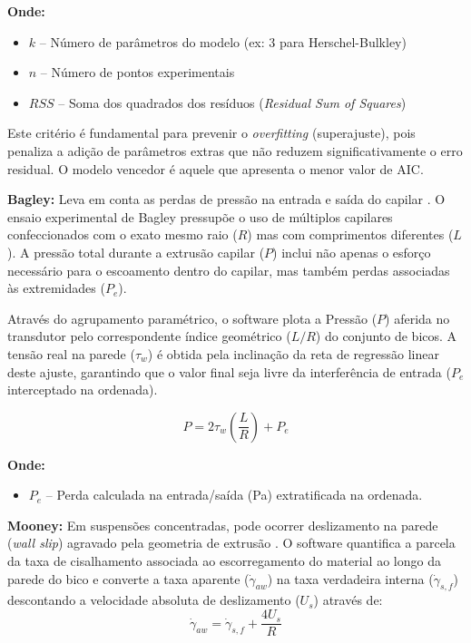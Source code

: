 \documentclass[a4paper,12pt]{article}
\begin{document}
\textbf{Onde:}
\begin{itemize}[leftmargin=1.5em]
  \item $k$ -- Número de parâmetros do modelo (ex: 3 para Herschel-Bulkley)
  \item $n$ -- Número de pontos experimentais
  \item $RSS$ -- Soma dos quadrados dos resíduos (\textit{Residual Sum of Squares})
\end{itemize}

Este critério é fundamental para prevenir o \textit{overfitting} (superajuste), pois penaliza a adição de parâmetros extras que não reduzem significativamente o erro residual. O modelo vencedor é aquele que apresenta o menor valor de AIC.

\vspace{1em}
\textbf{Bagley:} Leva em conta as perdas de pressão na entrada e saída do capilar \cite{barnes1989}. O ensaio experimental de Bagley pressupõe o uso de múltiplos capilares confeccionados com o exato mesmo raio ($R$) mas com comprimentos diferentes ($L$). A pressão total durante a extrusão capilar ($P$) inclui não apenas o esforço necessário para o escoamento dentro do capilar, mas também perdas associadas às extremidades ($P_e$). 

Através do agrupamento paramétrico, o software plota a Pressão ($P$) aferida no transdutor pelo correspondente índice geométrico ($L/R$) do conjunto de bicos. A tensão real na parede ($\tau_w$) é obtida pela inclinação da reta de regressão linear deste ajuste, garantindo que o valor final seja livre da interferência de entrada ($P_e$ interceptado na ordenada). 

\begin{equation}
P = 2 \tau_w \left( \frac{L}{R} \right) + P_e
\end{equation}

\textbf{Onde:}
\begin{itemize}[leftmargin=1.5em]
  \item $P_e$ -- Perda calculada na entrada/saída (\si{Pa}) extratificada na ordenada.
\end{itemize}

\textbf{Mooney:} Em suspensões concentradas, pode ocorrer deslizamento na parede (\textit{wall slip}) agravado pela geometria de extrusão \cite{barnes1989}. O software quantifica a parcela da taxa de cisalhamento associada ao escorregamento do material ao longo da parede do bico e converte a taxa aparente ($\dot{\gamma}_{aw}$) na taxa verdadeira interna ($\dot{\gamma}_{s,f}$) descontando a velocidade absoluta de deslizamento ($U_s$) através de:
\begin{equation}
\dot{\gamma}_{aw} = \dot{\gamma}_{s,f} + \frac{4 U_s}{R}
\end{equation}
\end{document}
